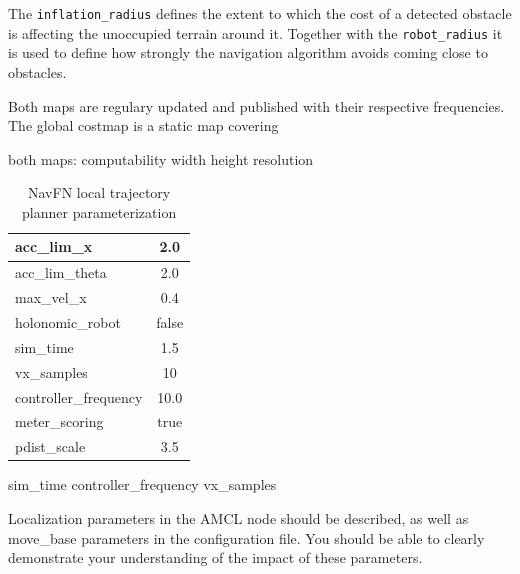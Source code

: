 \documentclass[10pt,journal,compsoc]{IEEEtran}
\begin{document}
The \texttt{inflation\_radius} defines the extent to which the cost of a detected obstacle is affecting the unoccupied terrain around it.
Together with the \texttt{robot\_radius} it is used to define how strongly the navigation algorithm avoids coming close to obstacles.

Both maps are regulary updated and published with their respective frequencies.
The global costmap is a static map covering 

both maps: computability
width
height
resolution



\begin{table}[h]
      \caption{NavFN local trajectory planner parameterization}
      \label{tab:planner_parameterization}
      \begin{center}
            \begin{tabular}{|l|c|}  \hline
      acc\_lim\_x & 2.0 \\ \hline
      acc\_lim\_theta & 2.0 \\ \hline
      max\_vel\_x & 0.4 \\ \hline
      holonomic\_robot & false \\ \hline
      sim\_time & 1.5 \\ \hline
      vx\_samples & 10 \\ \hline
      controller\_frequency & 10.0 \\ \hline
      meter\_scoring & true \\ \hline
      pdist\_scale & 3.5 \\ \hline
            \end{tabular}
      \end{center}
\end{table}                  

sim\_time
controller\_frequency
vx\_samples


Localization parameters in the AMCL node should be described, as well as move\_base parameters in the configuration file. You should be able to clearly demonstrate your understanding of the impact of these parameters.
\end{document}
